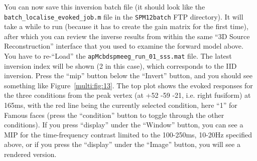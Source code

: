 You can now save this inversion batch file (it should look like the \texttt{batch\_localise\_evoked\_job.m} file in the \texttt{SPM12batch} FTP directory). It will take a while to run (because it has to create the gain matrix for the first time), after which you can review the inverse results from within the same ``3D Source Reconstruction'' interface that you used to examine the forward model above. You have to re-``Load'' the \texttt{apMcbdspmeeg\_run\_01\_sss.mat} file. The latest inversion index will be shown (2 in this case), which corresponds to the IID inversion. Press the ``mip'' button below the ``Invert'' button, and you should see something like Figure~\ref{multi:fig:13}. The top plot shows the evoked responses for the three conditions from the peak vertex (at +52 -59 -21, i.e. right fusiform) at 165ms, with the red line being the currently selected condition, here ``1'' for Famous faces (press the ``condition'' button to toggle through the other conditions). If you press ``display'' under the ``Window'' button, you can see a MIP for the time-frequency contrast limited to the 100-250ms, 10-20Hz specified above, or if you press the ``display'' under the ``Image'' button, you will see a rendered version.


